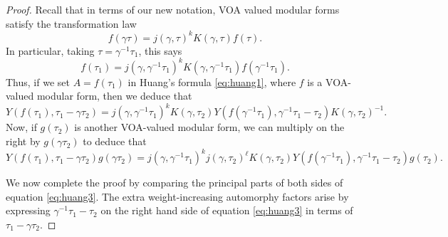 \documentclass[10pt,a4paper]{amsart}
\begin{document}
\begin{proof}
    Recall that in terms of our new notation, VOA valued modular forms satisfy the transformation law
    \[
      f(\gamma \tau) = j(\gamma,\tau)^kK(\gamma,\tau)f(\tau).
    \]
    In particular, taking $\tau = \gamma^{-1}\tau_1$, this says
    \[
      f(\tau_1) = j(\gamma,\gamma^{-1}\tau_1)^kK(\gamma,\gamma^{-1}\tau_1)f(\gamma^{-1}\tau_1).
    \]
    Thus, if we set $A = f(\tau_1)$ in Huang's formula \eqref{eq:huang1}, where $f$ is a VOA-valued modular form, then we deduce that
        \begin{equation}
        \label{eq:huang2}
        Y(f(\tau_1),\tau_1-\gamma \tau_2) = j(\gamma,\gamma^{-1}\tau_1)^kK(\gamma, \tau_2)Y(f(\gamma^{-1}\tau_1),\gamma^{-1}\tau_1-\tau_2) K(\gamma,\tau_2)^{-1}.
    \end{equation}
    Now, if $g(\tau_2)$ is another VOA-valued modular form, we can multiply on the right by $g(\gamma \tau_2)$ to deduce that
        \begin{equation}
        \label{eq:huang3}
        Y(f(\tau_1),\tau_1-\gamma \tau_2)g(\gamma \tau_2) = j(\gamma, \gamma^{-1}\tau_1)^kj(\gamma,\tau_2)^{\ell}K(\gamma, \tau_2)Y(f(\gamma^{-1}\tau_1),\gamma^{-1}\tau_1-\tau_2) g(\tau_2).
    \end{equation}

    We now complete the proof by comparing the principal parts of both sides of equation \eqref{eq:huang3}. The extra weight-increasing automorphy factors arise by expressing $\gamma^{-1}\tau_1-\tau_2$ on the right hand side of equation \eqref{eq:huang3} in terms of $\tau_1-\gamma\tau_2$.


\end{proof}
\end{document}
